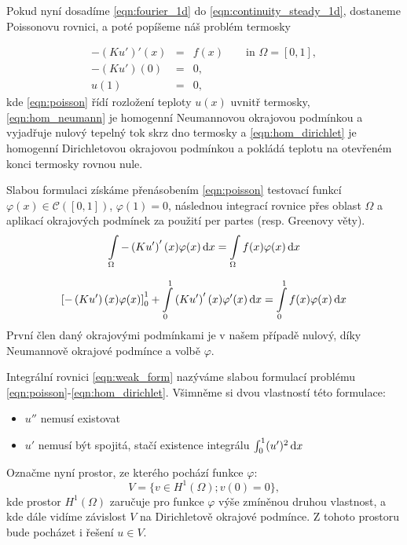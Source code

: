 Pokud nyní dosadíme \eqref{eqn:fourier_1d} do \eqref{eqn:continuity_steady_1d}, dostaneme Poissonovu rovnici,
a poté popíšeme náš problém termosky

\begin{eqnarray}
-(Ku')'(x) &=& f(x) \qquad \textrm{in } \Omega = [0,1], \label{eqn:poisson}\\
-(Ku')(0) &=& 0, \label{eqn:hom_neumann}\\
u(1) &=& 0, \label{eqn:hom_dirichlet}
\end{eqnarray}
kde \eqref{eqn:poisson} řídí rozložení teploty $u(x)$ uvnitř termosky,
\eqref{eqn:hom_neumann} je homogenní Neumannovou okrajovou podmínkou a vyjadřuje nulový tepelný tok skrz dno termosky
a \eqref{eqn:hom_dirichlet} je homogenní Dirichletovou okrajovou podmínkou a pokládá teplotu na otevřeném konci termosky rovnou nule.


Slabou formulaci získáme přenásobením \eqref{eqn:poisson} testovací funkcí $\varphi(x)\in\mathcal{C}([0,1])$, $\varphi(1)=0$, 
následnou integrací rovnice přes oblast $\Omega$ a aplikací okrajových podmínek za použití per partes (resp. Greenovy věty).
\[
  \int\limits_{\Omega} -\left( Ku'\right)'(x) \varphi(x) \,{\rm d} x = \int\limits_{\Omega} f(x) \varphi(x) \,{\rm d} x
\]

\begin{equation}
\left[-\left( Ku'\right)(x)\varphi(x)\right]_0^1 + \int\limits_0^1 \left( Ku'\right)'(x) \varphi'(x) \,{\rm d} x
    = \int\limits_0^1 f(x) \varphi(x) \,{\rm d} x\label{eqn:weak_form}
\end{equation}
První člen daný okrajovými podmínkami je v našem případě nulový, díky Neumannově okrajové podmínce a volbě $\varphi$.

Integrální rovnici \eqref{eqn:weak_form} nazýváme slabou formulací problému \eqref{eqn:poisson}-\eqref{eqn:hom_dirichlet}.
Všimněme si dvou vlastností této formulace:
\begin{itemize}
  \item $u''$ nemusí existovat
  \item $u'$ nemusí být spojitá, stačí existence integrálu $\int_0^1(u')^2 \,{\rm d} x$
\end{itemize}

Označme nyní prostor, ze kterého pochází funkce $\varphi$:
\begin{equation}
  V = \{v\in H^1(\Omega); v(0) = 0\},
\end{equation}
kde prostor $H^1(\Omega)$ zaručuje pro funkce $\varphi$ výše zmíněnou druhou vlastnost,
a kde dále vidíme závislost $V$ na Dirichletově okrajové podmínce.
Z tohoto prostoru bude pocházet i řešení $u\in V$.

